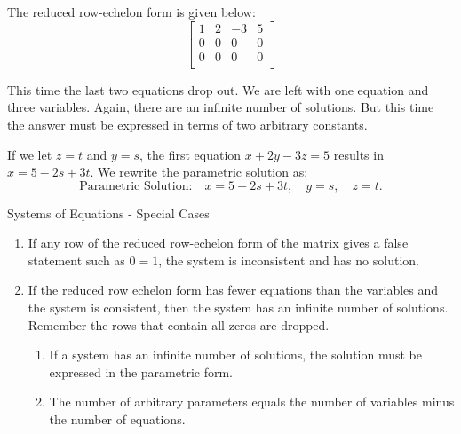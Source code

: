 \begin{solution}
    The reduced row-echelon form is given below:
    \[
        \left[
            \begin{array}{ccc|c}
                1 & 2 & -3 & 5 \\
                0 & 0 & 0  & 0 \\
                0 & 0 & 0  & 0 \\
            \end{array}
            \right]
    \]

    This time the last two equations drop out. We are left with one equation and three variables. Again, there are an infinite number of solutions. But this time the answer must be expressed in terms of two arbitrary constants.

    If we let \( z = t \) and \( y = s \), the first equation \( x + 2y - 3z = 5 \) results in \( x = 5 - 2s + 3t \). We rewrite the parametric solution as:
    \[ \text{Parametric Solution:} \quad x = 5 - 2s + 3t, \quad y = s, \quad z = t. \]
\end{solution}

\begin{summarybox}{Systems of Equations - Special Cases}
    \begin{enumerate}
        \item If any row of the reduced row-echelon form of the matrix gives a false statement such as \( 0 = 1 \), the system is inconsistent and has no solution.
        \item If the reduced row echelon form has fewer equations than the variables and the system is consistent, then the system has an infinite number of solutions. Remember the rows that contain all zeros are dropped.
              \begin{enumerate}
                  \item If a system has an infinite number of solutions, the solution must be expressed in the parametric form.
                  \item The number of arbitrary parameters equals the number of variables minus the number of equations.
              \end{enumerate}
    \end{enumerate}
\end{summarybox}